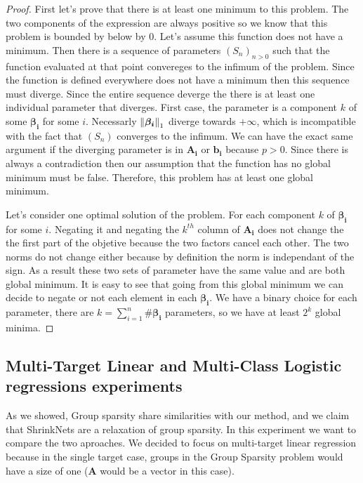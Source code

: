 \begin{proof}
First let's prove that there is at least one minimum to this problem. The two components of the expression are always positive so we know that this problem is bounded by below by $0$. Let's assume this function does not have a minimum. Then there is a sequence of parameters $(S_n)_{n>0}$ such that the function evaluated at that point convereges to the infimum of the problem. Since the function is defined everywhere does not have a minimum then this sequence must diverge. Since the entire sequence deverge the there is at least one individual parameter that diverges. First case, the parameter is a component $k$ of some $\bm{\beta_i}$ for some $i$. Necessarly $\left\lVert\bm{\beta_i}\right\rVert_1$ diverge towards $+ \infty$, which is incompatible with the fact that $(S_n)$ converges to the infimum. We can have the exact same argument if the diverging parameter is in $\bm{A_i}$ or $\bm{b_i}$ because $p > 0$. Since there is always a contradiction then our assumption that the function has no global minimum must be false. Therefore, this problem has at least one global minimum.

\par Let's consider one optimal solution of the problem. For each component $k$ of $\bm{\beta_i}$ for some $i$. Negating it and negating the $k^{th}$ column of $\bm{A_i}$ does not change the the first part of the objetive because the two factors cancel each other. The two norms do not change either because by definition the norm is independant of the sign. As a result these two sets of parameter have the same value and are both global minimum. It is easy to see that going from this global minimum we can decide to negate or not each element in each $\bm{\beta_i}$. We have a binary choice for each parameter, there are $k = \sum_{i=1}^n \#\bm{\beta_i}$ parameters, so we have at least $2^k$ global minima.

\end{proof}
\subsection{Multi-Target Linear and Multi-Class Logistic regressions experiments}
As we showed, Group sparsity share similarities with our method, and we claim
that ShrinkNets are a relaxation of group sparsity.  In this experiment we want
to compare the two aproaches.  We decided to focus on multi-target linear
regression because in the single target case, groups in the Group Sparsity
problem would have a size of one ($\bm{A}$ would be a vector in this case).

